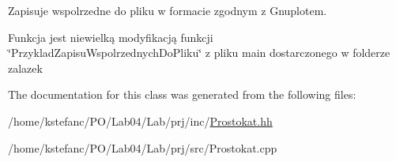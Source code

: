 Zapisuje wspolrzedne do pliku w formacie zgodnym z Gnuplotem. 

Funkcja jest niewielką modyfikacją funkcji \char`\"{}\+Przyklad\+Zapisu\+Wspolrzednych\+Do\+Pliku\char`\"{} z pliku main dostarczonego w folderze zalazek 

The documentation for this class was generated from the following files\+:\begin{DoxyCompactItemize}
\item 
/home/kstefanc/\+P\+O/\+Lab04/\+Lab/prj/inc/\hyperlink{_prostokat_8hh}{Prostokat.\+hh}\item 
/home/kstefanc/\+P\+O/\+Lab04/\+Lab/prj/src/Prostokat.\+cpp\end{DoxyCompactItemize}
